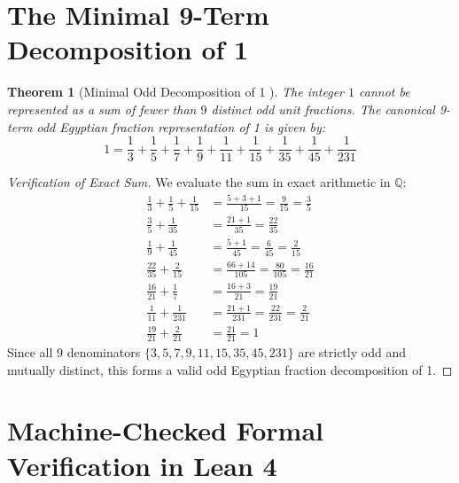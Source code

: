 \documentclass[11pt,a4paper]{article}
\newtheorem{theorem}{Theorem}[section]
\theoremstyle{definition}
\begin{document}
\section{The Minimal 9-Term Decomposition of 1}

\begin{theorem}[Minimal Odd Decomposition of 1 \cite{golomb1976}]\label{thm:minimal_nine}
The integer $1$ cannot be represented as a sum of fewer than $9$ distinct odd unit fractions.
The canonical 9-term odd Egyptian fraction representation of 1 is given by:
\begin{equation}\label{eq:canonical_nine}
1 = \frac{1}{3} + \frac{1}{5} + \frac{1}{7} + \frac{1}{9} + \frac{1}{11} + \frac{1}{15} + \frac{1}{35} + \frac{1}{45} + \frac{1}{231}
\end{equation}
\end{theorem}

\begin{proof}[Verification of Exact Sum]
We evaluate the sum in exact arithmetic in $\mathbb{Q}$:
\begin{align*}
\frac{1}{3} + \frac{1}{5} + \frac{1}{15} &= \frac{5 + 3 + 1}{15} = \frac{9}{15} = \frac{3}{5} \\
\frac{3}{5} + \frac{1}{35} &= \frac{21 + 1}{35} = \frac{22}{35} \\
\frac{1}{9} + \frac{1}{45} &= \frac{5 + 1}{45} = \frac{6}{45} = \frac{2}{15} \\
\frac{22}{35} + \frac{2}{15} &= \frac{66 + 14}{105} = \frac{80}{105} = \frac{16}{21} \\
\frac{16}{21} + \frac{1}{7} &= \frac{16 + 3}{21} = \frac{19}{21} \\
\frac{1}{11} + \frac{1}{231} &= \frac{21 + 1}{231} = \frac{22}{231} = \frac{2}{21} \\
\frac{19}{21} + \frac{2}{21} &= \frac{21}{21} = 1
\end{align*}
Since all 9 denominators $\{3, 5, 7, 9, 11, 15, 35, 45, 231\}$ are strictly odd and mutually distinct, this forms a valid odd Egyptian fraction decomposition of 1.
\end{proof}

\section{Machine-Checked Formal Verification in Lean 4}
\end{document}
